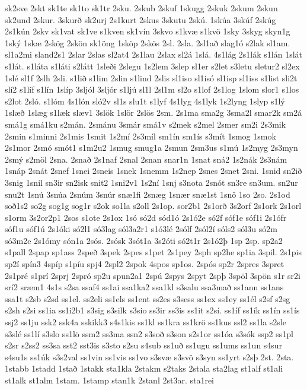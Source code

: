 {sk2sve
2skt
sk1te
sk1to
sk1tr
2sku.
2skub
2skuf
1skugg
2skuk
2skum
2skun
sk2und
2skur.
3skurð
sk2urj
2s1kurt
2skus
3skutu
2skú.
1skúa
3skúf
2skúg
2s1kún
2skv
sk1vat
sk1ve
s1kven
sk1vín
3skvo
s1kvæ
s1kvö
1sky
3skyg
skyn1g
1ský
1skæ
2skög
2skön
sk1öng
1sköp
2skös
2sl.
2sla.
2sl1að
slag1ó
s2lak
sl1am.
sl1a2mi
sland2s1
2slar
2slas
sl2at4
2s1lau
2slax
sl2á
1slá.
4s1lág
2s1lák
s1lán
1slát
s1lát.
s1láta
s1láti
s2látt
1sleði
2slegu
1s2lem
3slep
sl1er
s2let
s3letu
sletur2
sl2ex
1slé
sl1f
2slh
2sli.
s1lið
s1lim
2slin
s1lind
2slis
sl1iso
sl1isó
sl1isp
sl1iss
s1list
sli2t
slí2
s1líf
s1lín
1slíp
3sljól
3sljór
s1ljú
sl1l
2sl1m
sl2o
s1lof
2s1log
1slom
slor1
s1los
s2lot
2sló.
s1lóm
4s1lón
sló2v
sl1s
slu1t
s1lyf
4s1lyg
4s1lyk
1s2lyng
1slyp
s1lý
1slæð
1slæg
s1læk
slæv1
3slök
1slör
2slös
2sm.
2s1ma
sma2g
3sma2l
smar2k
sm2á
smá1g
smá1ku
s2mán.
2smánu
3smár
smá1v
s2mek
s2mel
2smer
sm2i
2s3mik
2smin
s1minni
2s1mis
1smit
1s2mí
2s3míl
sm1ín
sm1ís
s3mít
1smog
1smok
2s1mor
2smó
smót1
s1m2u2
1smug
smug1a
2smun
2sm3us
s1mú
1s2myg
2s3myn
2smý
s2möl
2sna.
2snað
2s1naf
2snal
2snan
snar1n
1snat
sná2
1s2nák
2s3nám
1snáp
2snát
2snef
1snei
2sneis
1snek
1snemm
1s2nep
2snes
2snet
2sni.
1snid
sn2ið
3snig
1snil
sn3ir
sn2isk
snit2
1sni2v1
1s2ní
1snj
s3nota
2snót
sn3re
sn3um.
sn2ur
snu2t
1snú
3snúa
2snúm
3snúr
snæ1fi
2snæg
1snær
snæ1st
1snö
1so
2so.
2s1od
soð1s2
so2g
sog1g
sog1r
s2ok
so1la
s2oll
2s1op.
sor2b1
2s1orð
3s2orf
2s1ork
2s1orl
s1orm
3s2or2p1
2sos
s1ote
2s1ox
1só
só2d
sód1ó
2s1ó2e
só2f
sóf1e
sóf1i
2s1ófr
sóf1u
sóf1ú
2s1óki
só2l1
só3lag
sól3a2r1
s1ó3lé
2sólf
2sól2í
sóls2
sól3u
só2m
só3m2e
2s1ómy
són1a
2sós.
2sósk
3sót1a
3s2óti
só2t1r
2s1ó2þ
1sp
2sp.
sp2a2
s1pall
2spap
sp1ass
2speð
3spek
2spes
s1pet
2s1pey
2sph
sp2he
sp1ia
3spil.
2s1pis
sp2í
spín3
4spíp
s1píu
spj4
2spl2
2spok
4spos
sp1os.
2spós
sp2r
2spres
3spret
2s1pré
s1prí
2sprj
2spró
sp2u
spun2a1
2spú
2spys
2spyt
2spþ
3spöl
3spön
s1r
sr2i
srí2
sræm1
4s1s
s2sa
ssaf4
ss1ai
ssa1ka2
ssa1kl
s3salu
ssa3mað
ss1ann
ss1ans
ssa1t
s2sb
s2sd
ss1el.
ss2eli
ss1els
ss1ent
ss2es
s3sess
ss1ex
ss1ey
ss1él
s2sf
s2sg
s2sh
s2si
ss1ia
ss1i2b1
s3sig
s3silk
s3sio
ss3ir
ss3is
ss1it
s2sí.
ss1íf
ss1ík
ss1ín
ss1ís
ssj2
ss1ju
ssk2
ssk4a
sskikk3
s4s1kis
ss1kl
ss1kra
ss1krö
ss1kus
ssl2
ss1la
s2sle
s3slé
ss1lí
s3slo
ss1lö
ssm2
ss3ma
ssn2
s3soð
s3son
s2s1or
ss1óa
s3sók
ssp2
ss1pl
s2sr
s2ss2
ss3sa
sst2
sst3is
s3sto
s2su
s4sub
ss1uð
ss1ugu
ss1ums
ss1un
s4sur
s4su1s
ss1úk
s3s2val
ss1vin
ss1vis
ss1vo
s3svæ
s3svö
s3syn
ss1yrt
s2sþ
2st.
2sta.
1stabb
1stadd
1stað
1stakk
sta1kla
2stakm
s2taks
2stala
sta2lag
st1alf
st1ali
st1alk
st1alm
1stam.
1stamp
stan1k
2stanl
2st3ar.
sta1rei
}
